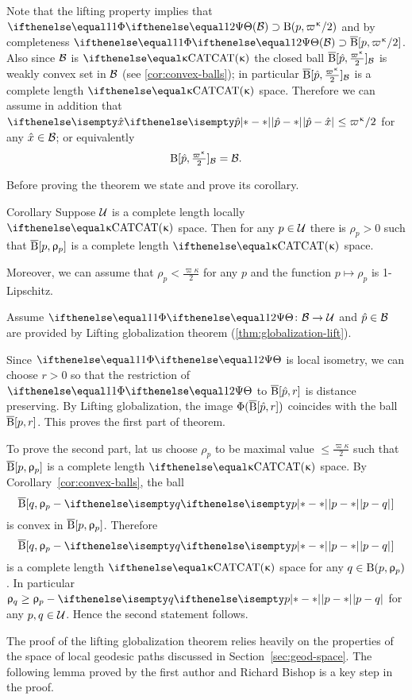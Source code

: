 
Note that the lifting property implies that $\map(\spc{B})\supset\oBall(p,\varpi\kappa/2)$ and by completeness $\map(\spc{B})\supset\cBall[p,\varpi\kappa/2]$.
Also since $\mathcal{B}$ is $\CAT\kappa$ the closed ball $\cBall[\hat p,\tfrac{\varpi\kappa}2]_{\spc{B}}$ is weakly convex set in $\mathcal{B}$ (see \ref{cor:convex-balls});
in particular $\cBall[\hat p,\tfrac{\varpi\kappa}2]_{\spc{B}}$ is a complete length $\CAT\kappa$ space.
Therefore we can assume in addition that $\dist{\hat p}{\hat x}{}\le \varpi\kappa/2$ for any $\hat x\in\spc{B}$;
or equivalently
\[\oBall[\hat p,\tfrac{\varpi\kappa}2]_{\spc{B}}=\spc{B}.\]


Before proving the theorem we state and prove its corollary.

\begin{thm}{Corollary}\label{cor:loc-CAT(k)}
Suppose $\mathcal{U}$ is a complete length locally $\CAT\kappa$ space.
Then for any $p\in\spc{U}$ there is $\rho_p>0$
such that $\overline{\mathrm{B}}{}[p,\upvarrho_p]$ is a complete length $\CAT\kappa$ space.

Moreover, we can assume that $\rho_p<\tfrac{\varpi\kappa}2$
for any $p$ and the function $p\mapsto\rho_p$ is 1-Lipschitz.
\end{thm}

Assume $\map\:\spc{B}\to \spc{U}$ 
and $\hat p\in \spc{B}$
are provided by Lifting globalization theorem
(\ref{thm:globalization-lift}).

Since $\map$ is local isometry,
we can choose $r>0$ so that the restriction of $\map$ to $\overline{\mathrm{B}}{}[\hat p,r]$ is distance preserving.
By Lifting globalization, the image  $\Phi(\overline{\mathrm{B}}{}[\hat p,r])$ coincides with the ball
$\overline{\mathrm{B}}{}[p,r]$.
This proves the first part of theorem.

To prove the second part, lat us choose $\rho_p$ to be maximal value $\le\tfrac{\varpi\kappa}2$ such that $\overline{\mathrm{B}}{}[p,\upvarrho_p]$ is a complete length $\CAT\kappa$ space.
By Corollary~\ref{cor:convex-balls}, the ball
\[\cBall[q,\rho_p-\dist{p}{q}{}]\] 
is convex in $\overline{\mathrm{B}}{}[p,\upvarrho_p]$.
Therefore  
\[\cBall[q,\rho_p-\dist{p}{q}{}]\] is a complete length $\CAT\kappa$ space
for any $q\in \oBall(p,\rho_p)$.
In particular $\rho_q\ge \rho_p-\dist{p}{q}{}$ for any $p,q\in\spc{U}$.
Hence the second statement follows.
\qeds




The proof of the lifting globalization theorem relies heavily on the properties of the space of local geodesic paths discussed in Section~\ref{sec:geod-space}.
The following lemma proved by the first author and Richard Bishop \cite{alexander-bishop:cbc} 
is a key step in the proof.

